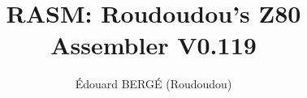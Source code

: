 \usepackage[space]{grffile}
\usepackage{enumitem}
\usepackage{tabularx}

\usepackage[hidelinks]{hyperref}
\usepackage[margin=3cm]{geometry}

\usepackage{makeidx}
\usepackage[table]{xcolor}
\usepackage{framed}
\usepackage{multicol}

\renewenvironment{leftbar}{\def\FrameCommand{\vrule width 0.5pt \hspace{8pt}}\MakeFramed {\advance\hsize-\width \FrameRestore}}{\endMakeFramed}

\newenvironment{code}
{
\begin{leftbar}
\begin{ttfamily}
\bgroup\obeylines
}
{
\egroup
\end{ttfamily}
\end{leftbar}
}


\usepackage{fancyhdr}
\pagestyle{fancy}

\fancyhead[L]{}
\fancyhead[R]{}
\setlength{\parindent}{0pt}

\title{RASM: Roudoudou's Z80 Assembler V0.119}

\author{\'Edouard BERG\'E (Roudoudou)}
\makeindex


\maketitle
\tableofcontents











\appendix








